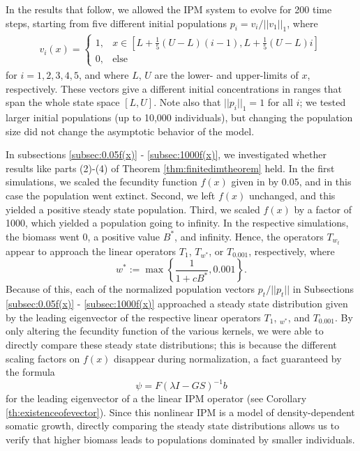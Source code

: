 In the results that follow, we allowed the IPM system to evolve for 200 time steps, starting from five different initial populations $p_i = v_i/||v_1||_1$, where
\begin{align}
	v_i(x) = \begin{cases} 1, & x \in \left[L + \frac{1}{5}(U-L)(i-1), L + \frac{1}{5}(U-L)i \right] \\ 0, & \text{else} \end{cases}
\end{align}
for $i = 1, 2, 3, 4, 5$, and where $L$, $U$ are the lower- and upper-limits of $x$, respectively. These vectors give a different initial concentrations in ranges that span the whole state space $[L, U]$. Note also that $||p_i||_1 = 1$ for all $i$; we tested larger initial populations (up to 10,000 individuals), but changing the population size did not change the asymptotic behavior of the model.

In subsections \ref{subsec:0.05f(x)} - \ref{subsec:1000f(x)}, we investigated whether results like parts (2)-(4) of Theorem \ref{thm:finitedimtheorem} held. In the first simulations, we scaled the fecundity function $f(x)$ given in \cite{Vindenes2014} by 0.05, and in this case the population went extinct. Second, we left $f(x)$ unchanged, and this yielded a positive steady state population. Third, we scaled $f(x)$ by  a factor of 1000, which yielded a population going to infinity. In the respective simulations, the biomass went 0, a positive value $B^*$, and infinity. Hence, the operators $T_{w_t}$ appear to approach the linear operators $T_1$, $T_{w^*}$, or $T_{0.001}$, respectively, where
\[w^*:= \max \left\{ \frac{1}{1 + c B^*}, 0.001 \right\}.\]
Because of this, each of the normalized population vectors $p_t/||p_t||$ in Subsections \ref{subsec:0.05f(x)} - \ref{subsec:1000f(x)} approached a steady state distribution given by the leading eigenvector of the respective linear operators $T_1$, $_{w^*}$, and $T_{0.001}$. By only altering the fecundity function of the various kernels, we were able to directly compare these steady state distributions; this is because the different scaling factors on $f(x)$ disappear during  normalization, a fact guaranteed by the formula 
\[\psi = F(\lambda I - GS)^{-1}b\]
for the leading eigenvector of a the linear IPM operator (see Corollary \ref{th:existenceofevector}). Since this nonlinear IPM is a model of density-dependent somatic growth, directly comparing the steady state distributions allows us to verify that higher biomass leads to populations dominated by smaller individuals.

